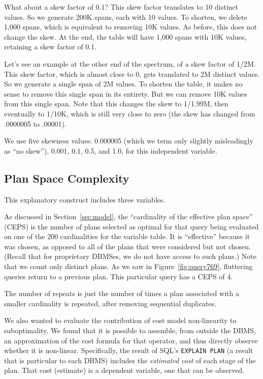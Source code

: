 \documentclass[prodmode,acmtods]{acmsmall}
\begin{document}
What about a skew factor of 0.1? 
This skew factor translates to 10 distinct values. 
So we generate 200K spans, each with 10 values. 
To shorten, we delete 1,000 spans, which is equivalent to removing 10K values. 
As before, this does not change the skew.
At the end, the table will have 1,000 spans with 10K values, retaining a
skew factor of 0.1.

Let's see an example at the other end of the spectrum, of a skew factor of
1/2M.  This skew factor, which is almost close to 0, gets translated to 2M
distinct values.  So we generate a single span of 2M values.  To shorten the
table, it makes no sense to remove this single span in its entirety. But we
can remove 10K values from this single span.  Note that this changes the
skew to 1/1.99M, then eventually to 1/10K, which is still very close to zero
(the skew has changed from .0000005 to .00001).

We use five skewness values: 0.000005 (which we term only slightly
misleadingly as ``no skew''), 0.001, 0.1, 0.5, and 1.0,
for this independent variable.

\subsection{Plan Space Complexity}\label{sec:discontinuity}

This explanatory construct includes three variables.

As discussed in Section~\ref{sec:model}, the ``cardinality of the effective plan
space'' (CEPS) is the number of plans selected as optimal for that query
being evaluated on one of the 200 cardinalities for the variable table. It
is ``effective'' because it was chosen, as opposed to all of the
plans that were considered but not chosen. (Recall that for proprietary
\hbox{DBMSes}, we do not have access to such plans.) Note that we count only
distinct plans. As we saw in Figure~\ref{fig:query769}, fluttering queries
return to a previous plan. This particular query has a CEPS of 4.

The number of repeats is just the number of times a plan associated with a
smaller cardinality is repeated, after removing sequential
duplicates. 

We also wanted to evaluate the contribution of cost model non-linearity to
suboptimality. We found that it is possible to assemble, from outside the
\hbox{DBMS}, an approximation of the cost formula for that operator, and thus
directly observe whether it is non-linear. Specifically, the result of SQL's
{\tt EXPLAIN PLAN} (a result that is particular to each \hbox{DBMS}) includes the
{\em estimated cost} of each stage of the plan. That cost (estimate) is a
dependent variable, one that can be observed.
\end{document}
